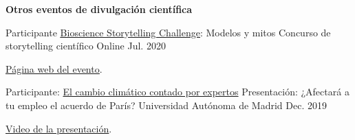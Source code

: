 \textbf{Otros eventos de divulgación científica}
\begin{cventries}
  \cventry
    {Participante \underline{\href{https://microbiosdigital.com/20/08/03/bioscience-storytelling-challenge/}{Bioscience Storytelling Challenge}}: Modelos y mitos} %
    {Concurso de storytelling científico} %
    {Online} %
    {Jul. 2020} %
    {
    \begin{cvitems} %
        \item {\underline{\href{https://microbiosdigital.com/2020/08/03/bioscience-storytelling-challenge/}{Página web del evento}}.}        	
    \end{cvitems}
    }
    
  \cventry
    {Participante:  \href{https://workshops.ift.uam-csic.es/cambioclimatico/Programa}{El cambio climático contado por expertos}} %
    {Presentación: ¿Afectará a tu empleo el acuerdo de París?} %
    {Universidad Autónoma de Madrid} %
    {Dec. 2019} %
    {
    \begin{cvitems} %
        \item {\underline{\href{https://m.youtube.com/watch?v=rB3-6bywW_Q}{Video de la presentación}}.}
    \end{cvitems}
    }
\end{cventries}
